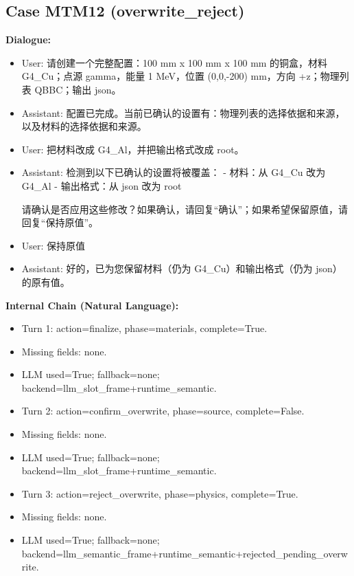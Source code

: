 \documentclass[11pt]{ctexart}
\begin{document}
\subsection{Case MTM12 (overwrite\_reject)}
\textbf{Dialogue:}
\begin{itemize}
\item User: 请创建一个完整配置：100 mm x 100 mm x 100 mm 的铜盒，材料 G4\_Cu；点源 gamma，能量 1 MeV，位置 (0,0,-200) mm，方向 +z；物理列表 QBBC；输出 json。
\item Assistant: 配置已完成。当前已确认的设置有：物理列表的选择依据和来源，以及材料的选择依据和来源。
\item User: 把材料改成 G4\_Al，并把输出格式改成 root。
\item Assistant: 检测到以下已确认的设置将被覆盖：
- 材料：从 G4\_Cu 改为 G4\_Al
- 输出格式：从 json 改为 root

请确认是否应用这些修改？如果确认，请回复“确认”；如果希望保留原值，请回复“保持原值”。
\item User: 保持原值
\item Assistant: 好的，已为您保留材料（仍为 G4\_Cu）和输出格式（仍为 json）的原有值。
\end{itemize}
\textbf{Internal Chain (Natural Language):}
\begin{itemize}
\item Turn 1: action=finalize, phase=materials, complete=True.
\item Missing fields: none.
\item LLM used=True; fallback=none; backend=llm\_slot\_frame+runtime\_semantic.
\item Turn 2: action=confirm\_overwrite, phase=source, complete=False.
\item Missing fields: none.
\item LLM used=True; fallback=none; backend=llm\_slot\_frame+runtime\_semantic.
\item Turn 3: action=reject\_overwrite, phase=physics, complete=True.
\item Missing fields: none.
\item LLM used=True; fallback=none; backend=llm\_semantic\_frame+runtime\_semantic+rejected\_pending\_overwrite.
\end{itemize}
\end{document}
